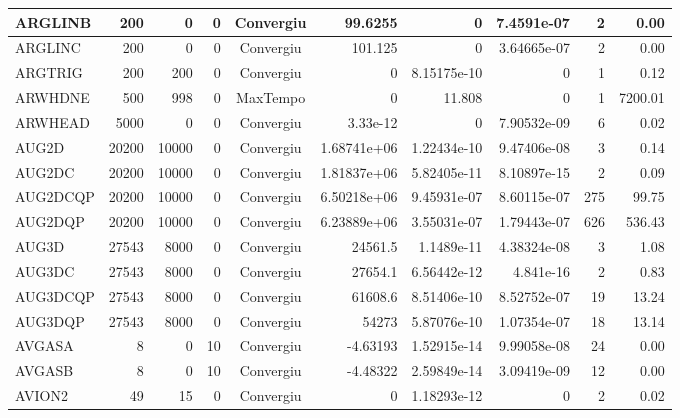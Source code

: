 \begin{center}
\begin{longtable}{|l|r|r|r|c|r|r|r|r|r|}
 ARGLINB &    200 &      0 &      0 & Convergiu  &     99.6255 &              0 &  7.4591e-07 &      2 &    0.00 \\ \hline
 ARGLINC &    200 &      0 &      0 & Convergiu  &     101.125 &              0 & 3.64665e-07 &      2 &    0.00 \\ \hline
 ARGTRIG &    200 &    200 &      0 & Convergiu  &           0 &    8.15175e-10 &           0 &      1 &    0.12 \\ \hline
 ARWHDNE &    500 &    998 &      0 & MaxTempo   &           0 &         11.808 &           0 &      1 & 7200.01 \\ \hline
 ARWHEAD &   5000 &      0 &      0 & Convergiu  &    3.33e-12 &              0 & 7.90532e-09 &      6 &    0.02 \\ \hline
   AUG2D &  20200 &  10000 &      0 & Convergiu  & 1.68741e+06 &    1.22434e-10 & 9.47406e-08 &      3 &    0.14 \\ \hline
  AUG2DC &  20200 &  10000 &      0 & Convergiu  & 1.81837e+06 &    5.82405e-11 & 8.10897e-15 &      2 &    0.09 \\ \hline
AUG2DCQP &  20200 &  10000 &      0 & Convergiu  & 6.50218e+06 &    9.45931e-07 & 8.60115e-07 &    275 &   99.75 \\ \hline
 AUG2DQP &  20200 &  10000 &      0 & Convergiu  & 6.23889e+06 &    3.55031e-07 & 1.79443e-07 &    626 &  536.43 \\ \hline
   AUG3D &  27543 &   8000 &      0 & Convergiu  &     24561.5 &     1.1489e-11 & 4.38324e-08 &      3 &    1.08 \\ \hline
  AUG3DC &  27543 &   8000 &      0 & Convergiu  &     27654.1 &    6.56442e-12 &   4.841e-16 &      2 &    0.83 \\ \hline
AUG3DCQP &  27543 &   8000 &      0 & Convergiu  &     61608.6 &    8.51406e-10 & 8.52752e-07 &     19 &   13.24 \\ \hline
 AUG3DQP &  27543 &   8000 &      0 & Convergiu  &       54273 &    5.87076e-10 & 1.07354e-07 &     18 &   13.14 \\ \hline
  AVGASA &      8 &      0 &     10 & Convergiu  &    -4.63193 &    1.52915e-14 & 9.99058e-08 &     24 &    0.00 \\ \hline
  AVGASB &      8 &      0 &     10 & Convergiu  &    -4.48322 &    2.59849e-14 & 3.09419e-09 &     12 &    0.00 \\ \hline
  AVION2 &     49 &     15 &      0 & Convergiu  &           0 &    1.18293e-12 &           0 &      2 &    0.02 \\ \hline

\end{longtable}
\end{center}
